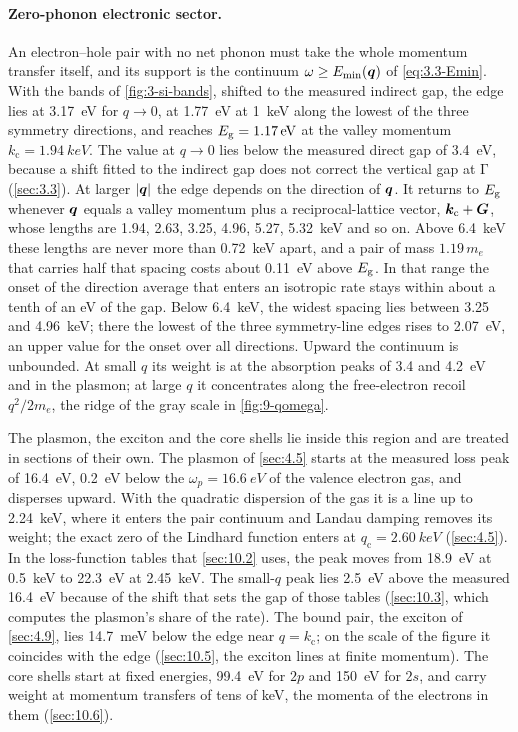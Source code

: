 \paragraph{Zero-phonon electronic sector.} An electron--hole pair with no net phonon must take the whole momentum transfer itself, and its support is the continuum $\omega \ge E_{\mathrm{min}}(\bm{q})$ of \cref{eq:3.3-Emin}. With the bands of \cref{fig:3-si-bands}, shifted to the measured indirect gap, the edge lies at \SI{3.17}{eV} for $q \to 0$, at \SI{1.77}{eV} at \SI{1}{keV} along the lowest of the three symmetry directions, and reaches $E_{\mathrm{g}} = \SI{1.17}{eV}$ at the valley momentum $k_{\mathrm{c}} = \SI{1.94}{keV}$. The value at $q \to 0$ lies below the measured direct gap of \SI{3.4}{eV}, because a shift fitted to the indirect gap does not correct the vertical gap at $\mathrm{\Gamma}$ (\cref{sec:3.3}). At larger $|\bm{q}|$ the edge depends on the direction of $\bm{q}$. It returns to $E_{\mathrm{g}}$ whenever $\bm{q}$ equals a valley momentum plus a reciprocal-lattice vector, $\bm{k}_{\mathrm{c}} + \bm{G}$, whose lengths are 1.94, 2.63, 3.25, 4.96, 5.27, \SI{5.32}{keV} and so on. Above \SI{6.4}{keV} these lengths are never more than \SI{0.72}{keV} apart, and a pair of mass $1.19\,m_e$ that carries half that spacing costs about \SI{0.11}{eV} above $E_{\mathrm{g}}$. In that range the onset of the direction average that enters an isotropic rate stays within about a tenth of an eV of the gap. Below \SI{6.4}{keV}, the widest spacing lies between 3.25 and \SI{4.96}{keV}; there the lowest of the three symmetry-line edges rises to \SI{2.07}{eV}, an upper value for the onset over all directions. Upward the continuum is unbounded. At small $q$ its weight is at the absorption peaks of 3.4 and \SI{4.2}{eV} and in the plasmon; at large $q$ it concentrates along the free-electron recoil $q^2/2m_e$, the ridge of the gray scale in \cref{fig:9-qomega}.

The plasmon, the exciton and the core shells lie inside this region and are treated in sections of their own. The plasmon of \cref{sec:4.5} starts at the measured loss peak of \SI{16.4}{eV}, \SI{0.2}{eV} below the $\omega_p = \SI{16.6}{eV}$ of the valence electron gas, and disperses upward. With the quadratic dispersion of the gas it is a line up to \SI{2.24}{keV}, where it enters the pair continuum and Landau damping removes its weight; the exact zero of the Lindhard function enters at $q_{\mathrm{c}} = \SI{2.60}{keV}$ (\cref{sec:4.5}). In the loss-function tables that \cref{sec:10.2} uses, the peak moves from \SI{18.9}{eV} at \SI{0.5}{keV} to \SI{22.3}{eV} at \SI{2.45}{keV}. The small-$q$ peak lies \SI{2.5}{eV} above the measured \SI{16.4}{eV} because of the shift that sets the gap of those tables (\cref{sec:10.3}, which computes the plasmon's share of the rate). The bound pair, the exciton of \cref{sec:4.9}, lies \SI{14.7}{meV} below the edge near $q = k_{\mathrm{c}}$; on the scale of the figure it coincides with the edge (\cref{sec:10.5}, the exciton lines at finite momentum). The core shells start at fixed energies, \SI{99.4}{eV} for $2p$ and \SI{150}{eV} for $2s$, and carry weight at momentum transfers of tens of keV, the momenta of the electrons in them (\cref{sec:10.6}).

